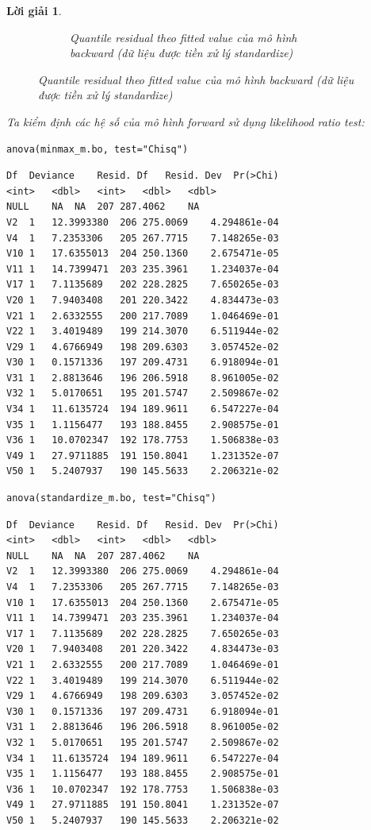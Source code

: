 \documentclass[14pt, a4paper]{article}
\theoremstyle{sltheorem}
\theoremstyle{soltheorem}
\newtheorem*{loigiai}{Lời giải}
\begin{document}
\begin{loigiai}
\begin{figure}[h!]
\begin{subfigure}[b]{0.4\textwidth}
            \caption{Quantile residual theo fitted value của mô hình backward (dữ liệu được tiền xử lý standardize)}
        \end{subfigure}
        \label{fig:Quantile-fitted-mb}
    \end{figure}

    Ta kiểm định các hệ số của mô hình forward sử dụng likelihood ratio test:

    \begin{verbatim}
anova(minmax_m.bo, test="Chisq")
    \end{verbatim}
    
    \begin{verbatim}
Df	Deviance	Resid. Df	Resid. Dev	Pr(>Chi)
<int>	<dbl>	<int>	<dbl>	<dbl>
NULL	NA	NA	207	287.4062	NA
V2	1	12.3993380	206	275.0069	4.294861e-04
V4	1	7.2353306	205	267.7715	7.148265e-03
V10	1	17.6355013	204	250.1360	2.675471e-05
V11	1	14.7399471	203	235.3961	1.234037e-04
V17	1	7.1135689	202	228.2825	7.650265e-03
V20	1	7.9403408	201	220.3422	4.834473e-03
V21	1	2.6332555	200	217.7089	1.046469e-01
V22	1	3.4019489	199	214.3070	6.511944e-02
V29	1	4.6766949	198	209.6303	3.057452e-02
V30	1	0.1571336	197	209.4731	6.918094e-01
V31	1	2.8813646	196	206.5918	8.961005e-02
V32	1	5.0170651	195	201.5747	2.509867e-02
V34	1	11.6135724	194	189.9611	6.547227e-04
V35	1	1.1156477	193	188.8455	2.908575e-01
V36	1	10.0702347	192	178.7753	1.506838e-03
V49	1	27.9711885	191	150.8041	1.231352e-07
V50	1	5.2407937	190	145.5633	2.206321e-02        
    \end{verbatim}

    \begin{verbatim}
anova(standardize_m.bo, test="Chisq")
    \end{verbatim}

    \begin{verbatim}
Df	Deviance	Resid. Df	Resid. Dev	Pr(>Chi)
<int>	<dbl>	<int>	<dbl>	<dbl>
NULL	NA	NA	207	287.4062	NA
V2	1	12.3993380	206	275.0069	4.294861e-04
V4	1	7.2353306	205	267.7715	7.148265e-03
V10	1	17.6355013	204	250.1360	2.675471e-05
V11	1	14.7399471	203	235.3961	1.234037e-04
V17	1	7.1135689	202	228.2825	7.650265e-03
V20	1	7.9403408	201	220.3422	4.834473e-03
V21	1	2.6332555	200	217.7089	1.046469e-01
V22	1	3.4019489	199	214.3070	6.511944e-02
V29	1	4.6766949	198	209.6303	3.057452e-02
V30	1	0.1571336	197	209.4731	6.918094e-01
V31	1	2.8813646	196	206.5918	8.961005e-02
V32	1	5.0170651	195	201.5747	2.509867e-02
V34	1	11.6135724	194	189.9611	6.547227e-04
V35	1	1.1156477	193	188.8455	2.908575e-01
V36	1	10.0702347	192	178.7753	1.506838e-03
V49	1	27.9711885	191	150.8041	1.231352e-07
V50	1	5.2407937	190	145.5633	2.206321e-02
    \end{verbatim}


\end{loigiai}
\end{document}
